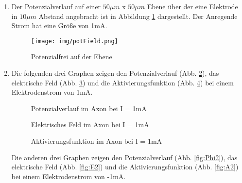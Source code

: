 \documentclass[conference]{IEEEtran}
\begin{document}
\begin{enumerate}
\item Der Potenzialverlauf auf einer $50\mu m$ x $50\mu m$ Ebene über der eine Elektrode in $10\mu m$ Abstand angebracht ist in Abbildung \ref{fig:potField} dargestellt. Der Anregende Strom hat eine Größe von 1mA.

\begin{figure}[h]
	\centering
	\texttt{[image: img/potField.png]}
	\caption{Potenzialfrei auf der Ebene}
	\label{fig:potField}
\end{figure}

\item Die folgenden drei Graphen zeigen den Potenzialverlauf (Abb. \ref{fig:Phi1}), das elektrische Feld (Abb. \ref{fig:E1}) und die Aktivierungsfunktion (Abb. \ref{fig:A1}) bei einem Elektrodenstrom von 1mA.\\

\begin{figure}[h!]
  	\centering
    \scalebox{.5}{}
    \vspace{-10pt}
    \caption{Potenzialverlauf im Axon bei I = 1mA}
    \vspace{-10pt}
    \label{fig:Phi1}
\end{figure}
\begin{figure}[h!]
  	\centering
    \scalebox{.5}{}
    \vspace{-10pt}
    \caption{Elektrisches Feld im Axon bei I = 1mA}
    \vspace{-10pt}
    \label{fig:E1}
\end{figure}
\begin{figure}[h!]
  	\centering
    \scalebox{.5}{}
    \vspace{-10pt}
    \caption{Aktivierungsfunktion im Axon bei I = 1mA}
    \vspace{-10pt}
    \label{fig:A1}
\end{figure}

Die anderen drei Graphen zeigen den Potenzialverlauf (Abb. \ref{fig:Phi2}), das elektrische Feld (Abb. \ref{fig:E2}) und die Aktivierungsfunktion (Abb. \ref{fig:A2}) bei einem Elektrodenstrom von -1mA.


\end{enumerate}
\end{document}
